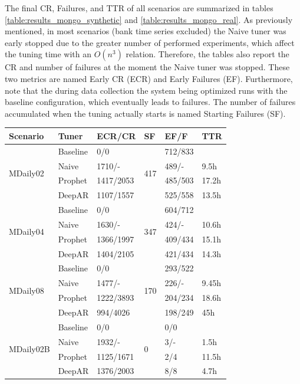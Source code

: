 \documentclass[a4paper, 12pt]{article} %
\newcommand{\ra}[1]{\renewcommand{\arraystretch}{#1}}
\begin{document}
	The final CR, Failures, and TTR of all scenarios are summarized in tables \ref{table:results_mongo_synthetic} and \ref{table:results_mongo_real}. As previously mentioned, in most scenarios (bank time series excluded) the Naive tuner was early stopped due to the greater number of performed experiments, which affect the tuning time with an $O(n^3)$ relation. Therefore, the tables also report the CR and number of failures at the moment the Naive tuner was stopped. These two metrics are named Early CR (ECR) and Early Failures (EF). Furthermore, note that the during data collection the system being optimized runs with the baseline configuration, which eventually leads to failures. The number of failures accumulated when the tuning actually starts is named Starting Failures (SF).

	\begin{table}\centering 
		\ra{1.3}
		\begin{tabularx}{\textwidth}{@{}XXXXXX@{}}
			\toprule
			Scenario & Tuner & ECR/CR & SF & EF/F & TTR\\
			
			\midrule
			\multirow{4}{*}{MDaily02}
			& Baseline & 0/0 & \multirow{4}{*}{417} & 712/833 & \\
			& Naive & 1710/-  && 489/- & 9.5h \\
			& Prophet & 1417/2053 && 485/503 & 17.2h\\
			& DeepAR & 1107/1557 && 525/558 & 13.5h\\
			
			
			\midrule
			\multirow{4}{*}{MDaily04}
			& Baseline & 0/0 & \multirow{4}{*}{347}  & 604/712 & \\
			& Naive & 1630/- && 424/- & 10.6h \\
			& Prophet & 1366/1997 && 409/434 & 15.1h \\
			& DeepAR & 1404/2105 && 421/434 & 14.3h \\
			
			\midrule
			\multirow{4}{*}{MDaily08}
			& Baseline & 0/0 & \multirow{4}{*}{170} & 293/522 & \\
			& Naive & 1477/- && 226/- & 9.45h\\
			& Prophet & 1222/3893 && 204/234 & 18.6h\\
			& DeepAR & 994/4026 && 198/249 & 45h\\
			
			\midrule
			\multirow{4}{*}{MDaily02B}
			& Baseline & 0/0 & \multirow{4}{*}{0} & 0/0 & \\
			& Naive & 1932/- && 3/- & 1.5h  \\
			& Prophet & 1125/1671 && 2/4 & 11.5h \\
			& DeepAR & 1376/2003 && 8/8 & 4.7h\\
			

\end{tabularx}
\end{table}
\end{document}
